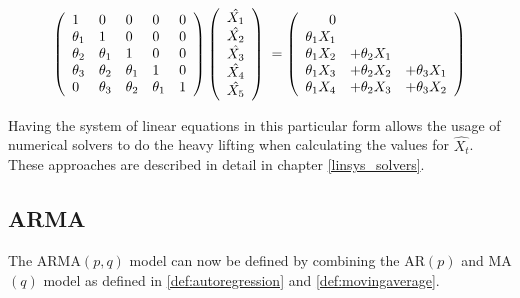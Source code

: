 \begin{equation}\label{eq:MA_hat_3_system_3}
    \left(\begin{array}[c]{lllll}
        1 & 0 & 0 & 0 & 0\\
        \theta_1 & 1 & 0 & 0 & 0\\
        \theta_2 & \theta_1& 1 & 0 & 0\\
        \theta_3 & \theta_2 & \theta_1& 1 & 0\\
        0 & \theta_3 & \theta_2 & \theta_1& 1
    \end{array}\right)
    \left(\begin{array}[c]{c}
        \hat{X_1}\\
        \hat{X_2}\\
        \hat{X_3}\\
        \hat{X_4}\\
        \hat{X_5}
    \end{array}\right)
    \;=
    \left(\begin{array}[c]{rrr}
        0 &&\\ 
        \theta_1 X_{1} &&\\
        \theta_1 X_{2} &+ \theta_2 X_{1} &\\
        \theta_1 X_{3} &+ \theta_2 X_{2} &+ \theta_3 X_{1} \\
        \theta_1 X_{4} &+ \theta_2 X_{3} &+ \theta_3 X_{2} 
    \end{array}\right)
\end{equation}

Having the system of linear equations in this particular form allows the usage of numerical solvers to do the heavy lifting when calculating the values for $\hat{X_t}$. These approaches are described in detail in chapter \ref{linsys_solvers}.

\subsection*{\acl{ARMA}}\label{section:arma}

The \acs{ARMA}$(p,q)$ model can now be defined by combining the \acs{AR}$(p)$ and \acs{MA}$(q)$ model as defined in \ref{def:autoregression} and \ref{def:movingaverage}.

